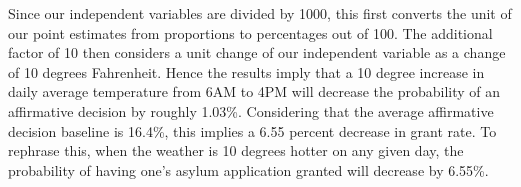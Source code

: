 \documentclass{article}
\begin{document}
	Since our independent variables are divided by 1000, this first converts the unit of our point estimates from proportions to percentages out of 100. The additional factor of 10 then considers a unit change of our independent variable as a change of 10 degrees Fahrenheit. Hence the results imply that a 10 degree increase in daily average temperature from 6AM to 4PM will decrease the probability of an affirmative decision by roughly 1.03\%. Considering that the average affirmative decision baseline is 16.4\%, this implies a 6.55 percent decrease in grant rate. To rephrase this, when the weather is 10 degrees hotter on any given day, the probability of having one's asylum application granted will decrease by 6.55\%. 
	
	
	\begin{table}[h!]
		
		\caption{Main Results}
		
		\label{tab:paper_tab2}
	\end{table}
	
\end{document}
